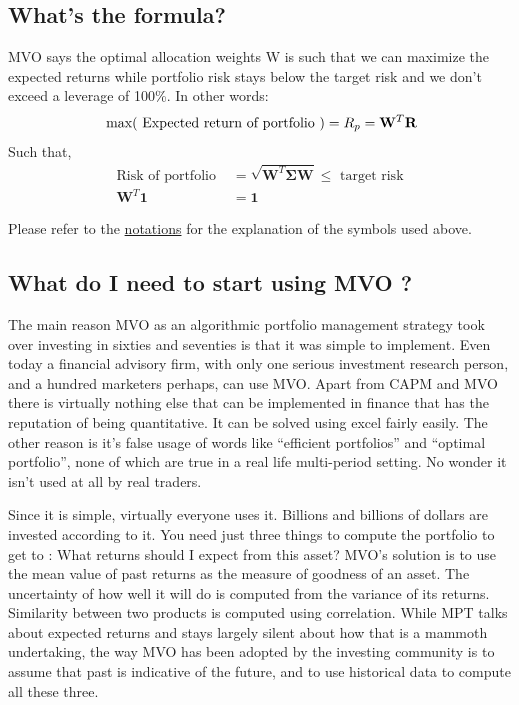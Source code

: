 \documentclass[a4paper]{article}
\begin{document}
\subsection{ What’s the formula? }
MVO says the optimal allocation weights W is such that we can maximize the expected returns while portfolio risk stays below the target risk and we don’t exceed a leverage of 100\%. In other words:
\[\text{ max( Expected return of portfolio )} = R_p = \mathbf{W}^T\mathbf{R} \\ \]
Such that,
\begin{align*}
\text{Risk of portfolio }  &= \sqrt{ \mathbf{W}^T\mathbf{\Sigma} \mathbf{W }} \leq \text{ target risk} \\
\mathbf{W}^T \mathbf{1} &= \mathbf{1}
\end{align*}

\begin{flushleft}
 Please refer to the \hyperref[notations]{notations} for the explanation of the symbols used above.
 \end{flushleft} 

\subsection{ What do I need to start using MVO ? \label{how-to-use-MVO}}
The main reason MVO as an algorithmic portfolio management strategy took over investing in sixties and seventies is that it was simple to implement. Even today a financial advisory firm, with only one serious investment research person, and a hundred marketers perhaps, can use MVO. Apart from CAPM and MVO there is virtually nothing else that can be implemented in finance that has the reputation of being quantitative. It can be solved using excel fairly easily. The other reason is it’s false usage of words like “efficient portfolios” and “optimal portfolio”, none of which are true in a real life multi-period setting. No wonder it isn’t used at all by real traders.

Since it is simple, virtually everyone uses it. Billions and billions of dollars are invested according to it. You need just three things to compute the portfolio to get to :
What returns should I expect from this asset? MVO’s solution is to use the mean value of past returns as the measure of goodness of an asset. 
The uncertainty of how well it will do is computed from the variance of its returns.
Similarity between two products is computed using correlation. 
While MPT talks about expected returns and stays largely silent about how that is a mammoth undertaking, the way MVO has been adopted by the investing community is to assume that past is indicative of the future, and to use historical data to compute all these three. 
\end{document}
